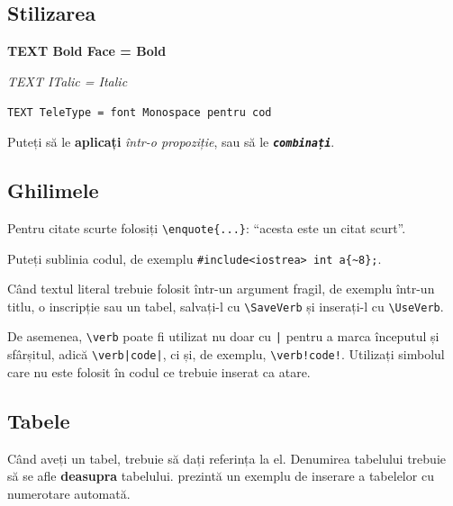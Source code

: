 \documentclass[a4paper,12pt]{report}
\begin{document}
\subsection{Stilizarea}

\textbf{TEXT Bold Face = Bold}

\textit{TEXT ITalic = Italic}

\texttt{TEXT TeleType = font Monospace pentru cod}

Puteți să le \textbf{aplicați} \textit{într-o propoziție}, sau să le \texttt{\textit{\textbf{combinați}}}.

\subsection{Ghilimele}

Pentru citate scurte folosiți \verb|\enquote{...}|:
\enquote{acesta este un citat scurt}.

Puteți sublinia codul, de exemplu \verb|#include<iostrea> int a{~8};|.

Când textul literal trebuie folosit într-un argument fragil, de exemplu într-un titlu,
o inscripție sau un tabel, salvați-l cu \verb|\SaveVerb| și inserați-l cu \verb|\UseVerb|.

De asemenea, \verb|\verb| poate fi utilizat nu doar cu \verb!|! pentru a marca începutul și sfârșitul,
adică \verb!\verb|code|!, ci și, de exemplu, \verb|\verb!code!|.
Utilizați simbolul care nu este folosit în codul ce trebuie inserat ca atare.

\subsection{Tabele}

Când aveți un tabel, trebuie să dați referința la el.
Denumirea tabelului trebuie să se afle \textbf{deasupra} tabelului.
 prezintă un exemplu de inserare a tabelelor cu numerotare automată.

\end{document}
